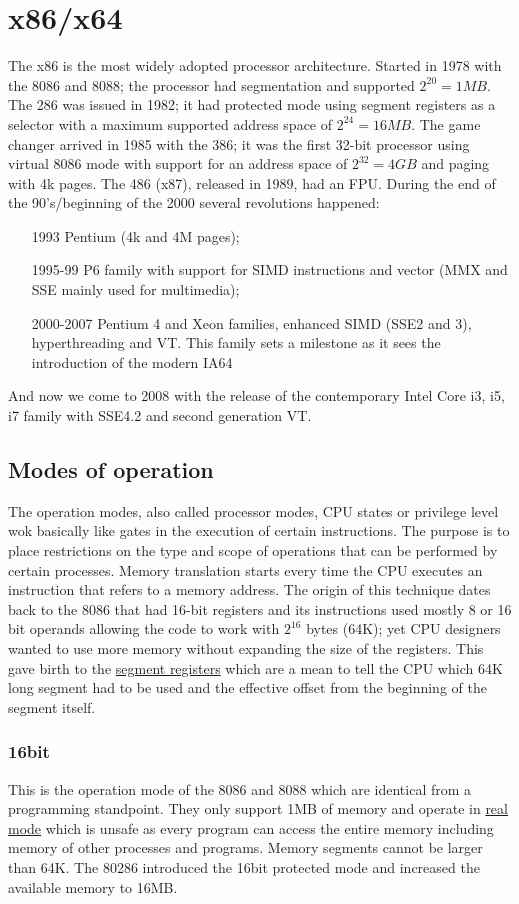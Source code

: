 \documentclass[paper=a4, fontsize=11pt]{report} %
\numberwithin{equation}{section} %
\numberwithin{figure}{section} %
\numberwithin{table}{section} %
\begin{document}
\section{x86/x64}
The x86 is the most widely adopted processor architecture. Started in 1978 with 
the 8086 and 8088; the processor had segmentation and supported $2^{20} = 1MB$.
The 286 was issued in 1982; it had protected mode using segment registers as a 
selector with a maximum supported address space of $2^{24} = 16MB$. The game 
changer arrived in 1985 with the 386; it was the first 32-bit processor using 
virtual 8086 mode with support for an address space of $2^{32} = 4GB$ and 
paging with 4k pages. The 486 (x87), released in 1989, had an FPU. During the 
end of the 90's/beginning of the 2000 several revolutions happened:
\begin{itemize}
    \item[1993] Pentium (4k and 4M pages);
    \item[1995-99] P6 family with support for SIMD instructions and vector (MMX 
    and SSE mainly used for multimedia);
    \item[2000-2007] Pentium 4 and Xeon families, enhanced SIMD (SSE2 and 3), 
    hyperthreading and VT. This family sets a milestone as it sees the 
    introduction of the modern IA64
\end{itemize}
And now we come to 2008 with the release of the contemporary Intel Core i3, i5, 
i7 family with SSE4.2 and second generation VT.
\subsection{Modes of operation}
The operation modes, also called processor modes, CPU states or privilege level 
wok basically like gates in the execution of certain instructions. The purpose 
is to place restrictions on the type and scope of operations that can be 
performed by certain processes. Memory translation starts
every time the CPU executes an instruction that refers to a memory address. The
origin of this technique dates back to the 8086 that had 16-bit registers and
its instructions used mostly 8 or 16 bit operands allowing the code to work with
$2^{16}$ bytes (64K); yet CPU designers wanted to use more memory without
expanding the size of the registers. This gave birth to the \underline{segment
registers} which are a mean to tell the CPU which 64K long segment had to be
used and the effective offset from the beginning of the segment itself.
\subsubsection{16bit}
This is the operation mode of the 8086 and 8088 which are identical from a
programming standpoint. They only support 1MB of memory and operate in
\underline{real mode} which is unsafe as every program can access the entire
memory including memory of other processes and programs. Memory segments cannot
be larger than 64K. The 80286 introduced the 16bit protected mode and increased
the available memory to 16MB.
\end{document}
